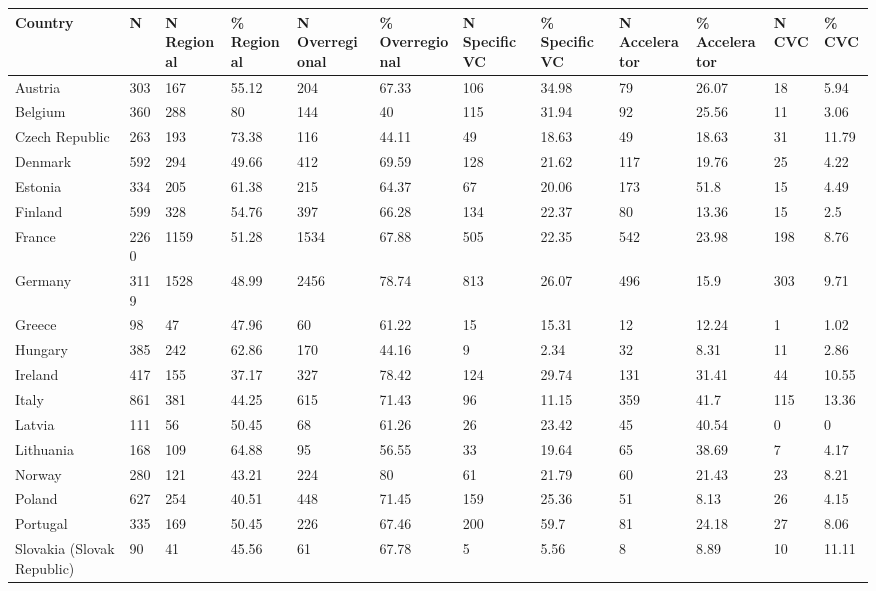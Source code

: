 \begin{tabular}{llllllllllll}
  \toprule
Country & N & N Regional & \% Regional & N Overregional & \% Overregional & N Specific VC & \% Specific VC & N Accelerator & \% Accelerator & N CVC & \% CVC \\ 
  \midrule
Austria & 303 & 167 & 55.12 & 204 & 67.33 & 106 & 34.98 & 79 & 26.07 & 18 & 5.94 \\ 
  Belgium & 360 & 288 & 80 & 144 & 40 & 115 & 31.94 & 92 & 25.56 & 11 & 3.06 \\ 
  Czech Republic & 263 & 193 & 73.38 & 116 & 44.11 & 49 & 18.63 & 49 & 18.63 & 31 & 11.79 \\ 
  Denmark & 592 & 294 & 49.66 & 412 & 69.59 & 128 & 21.62 & 117 & 19.76 & 25 & 4.22 \\ 
  Estonia & 334 & 205 & 61.38 & 215 & 64.37 & 67 & 20.06 & 173 & 51.8 & 15 & 4.49 \\ 
  Finland & 599 & 328 & 54.76 & 397 & 66.28 & 134 & 22.37 & 80 & 13.36 & 15 & 2.5 \\ 
  France & 2260 & 1159 & 51.28 & 1534 & 67.88 & 505 & 22.35 & 542 & 23.98 & 198 & 8.76 \\ 
  Germany & 3119 & 1528 & 48.99 & 2456 & 78.74 & 813 & 26.07 & 496 & 15.9 & 303 & 9.71 \\ 
  Greece & 98 & 47 & 47.96 & 60 & 61.22 & 15 & 15.31 & 12 & 12.24 & 1 & 1.02 \\ 
  Hungary & 385 & 242 & 62.86 & 170 & 44.16 & 9 & 2.34 & 32 & 8.31 & 11 & 2.86 \\ 
  Ireland & 417 & 155 & 37.17 & 327 & 78.42 & 124 & 29.74 & 131 & 31.41 & 44 & 10.55 \\ 
  Italy & 861 & 381 & 44.25 & 615 & 71.43 & 96 & 11.15 & 359 & 41.7 & 115 & 13.36 \\ 
  Latvia & 111 & 56 & 50.45 & 68 & 61.26 & 26 & 23.42 & 45 & 40.54 & 0 & 0 \\ 
  Lithuania & 168 & 109 & 64.88 & 95 & 56.55 & 33 & 19.64 & 65 & 38.69 & 7 & 4.17 \\ 
  Norway & 280 & 121 & 43.21 & 224 & 80 & 61 & 21.79 & 60 & 21.43 & 23 & 8.21 \\ 
  Poland & 627 & 254 & 40.51 & 448 & 71.45 & 159 & 25.36 & 51 & 8.13 & 26 & 4.15 \\ 
  Portugal & 335 & 169 & 50.45 & 226 & 67.46 & 200 & 59.7 & 81 & 24.18 & 27 & 8.06 \\ 
  Slovakia (Slovak Republic) & 90 & 41 & 45.56 & 61 & 67.78 & 5 & 5.56 & 8 & 8.89 & 10 & 11.11 \\ 

\end{tabular}
